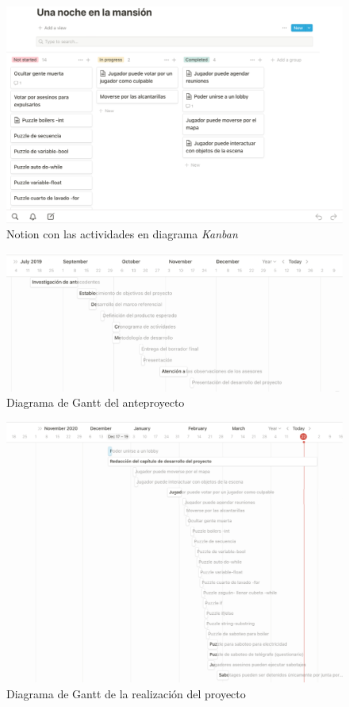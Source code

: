 \begin{figure}[H]
    \centering
    \includegraphics[width=0.8\linewidth]{images/notion.png}
    \caption{Notion con las actividades en diagrama \textit{Kanban}}
    \label{fig:notion_proyecto}
\end{figure}
\begin{figure}[H]
    \centering
    \includegraphics[width=0.8\linewidth]{images/DiagramaGanttAnteproyecto.PNG}
    \caption{Diagrama de Gantt del anteproyecto}
    \label{fig:gantt_anteproyecto}
\end{figure}
\begin{figure}[H]
    \centering
    \includegraphics[width=0.8\linewidth]{images/MapaGanttProyecto.png}
    \caption{Diagrama de Gantt de la realización del proyecto}
    \label{fig:gantt_proyecto}
\end{figure}

